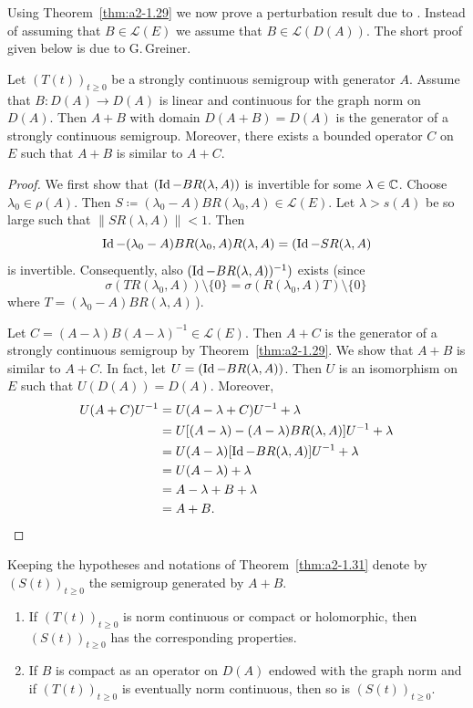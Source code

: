 Using Theorem~\ref{thm:a2-1.29}   we now prove a perturbation result due to \textcite{deschschappacher:1984}.
Instead of assuming that $B \in \mathcal{L}(E)$ we assume that $B \in \mathcal{L}(D(A))$.
The short proof given below is due to G.\,Greiner.
\begin{theorem}\label{thm:a2-1.31}
Let $(T(t))_{t \geq 0}$ be a strongly continuous semigroup with generator $A$.
Assume that $B \colon D(A) \to D(A)$ is linear and continuous for the graph norm on $D(A)$.
Then $A + B$ with domain $D(A + B) = D(A)$ is the generator of a strongly continuous semigroup.
Moreover, there exists a bounded operator $C$ on $E$ such that $A + B$ is similar to $A + C$.
\end{theorem}
\begin{proof}
We first show that $(\operatorname{Id} - BR(\lambda,A))$ is invertible for some $\lambda \in \mathbb{C}$.
Choose $\lambda_{0} \in \rho(A)$.
Then $S \coloneq (\lambda_{0}-A)BR(\lambda_{0},A) \in \mathcal{L}(E)$.
Let $\lambda > s(A)$ be so large such that $\|SR(\lambda,A)\| < 1$.
Then 
\[
\operatorname{Id} - (\lambda_{0} - A)BR(\lambda_{0},A)R(\lambda,A) = (\operatorname{Id} - SR(\lambda,A)
\]
is invertible.
Consequently, also $(\operatorname{Id} -BR(\lambda,A))^{-1})$ exists
(since 
\[
\sigma(TR(\lambda_{0},A)) \setminus \{0\} 
= \sigma(R(\lambda_{0},A)T) \setminus \{0\}\,
\]
where  $T = (\lambda_{0}-A)BR(\lambda,A)\, $).

Let $C = (A-\lambda)B(A-\lambda)^{-1} \in \mathcal{L}(E)$.
Then $A + C$ is the generator of a strongly continuous semigroup by Theorem~\ref{thm:a2-1.29}. 
We show that $A + B$ is similar to $A + C$.
In fact, let $U = (\operatorname{Id} - BR(\lambda,A))$.
Then $U$ is an isomorphism on $E$ such that $U(D(A)) = D(A)$. Moreover,
\begin{align*}		
U(A+C)U^{-1} &= U(A - \lambda+C)U^{-1} + \lambda \\
&= U[(A - \lambda) - (A-\lambda)BR(\lambda,A)]U^{-1} + \lambda \\
&= U(A - \lambda)[\Id - BR(\lambda,A)]U^{-1} + \lambda \\
&= U(A - \lambda) + \lambda \\
&= A - \lambda + B + \lambda \\
&= A + B.	\tag*{\qedsymbol}%
\end{align*}
\let\qedsymbol\relax
\end{proof}
\begin{corollary}\label{cor:a2-1.32}
Keeping the hypotheses and notations of Theorem~\ref{thm:a2-1.31} denote by 
$(S(t))_{t\geq 0}$ the semigroup generated by $A+B$.
\begin{enumerate}[\upshape(i)]
\item
If\/ $(T(t))_{t\geq 0}$ is norm continuous or compact or holomorphic, then $(S(t))_{t\geq 0}$ has the corresponding properties.

\item
If\/ $B$ is compact as an operator on $D(A)$ endowed with the graph norm and if\/ $(T(t))_{t\geq 0}$ is eventually norm continuous, then so is $(S(t))_{t\geq 0}$.
\end{enumerate}
\end{corollary}
